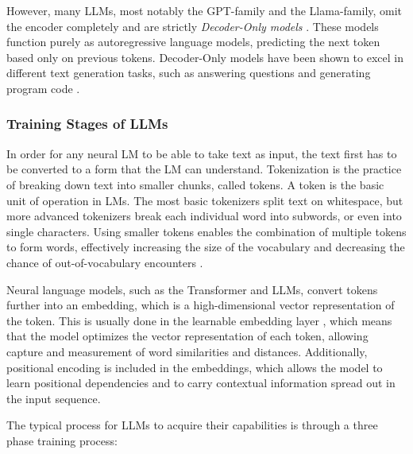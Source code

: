 \documentclass[english, 12pt, a4paper, sci, utf8, a-2b, online]{latex/definitions/aaltothesis}
\begin{document}
However, many LLMs, most notably the GPT-family and the Llama-family, omit the encoder completely and are strictly \textit{Decoder-Only models} \cite{Minaee2024-fr}. These models function purely as autoregressive language models, predicting the next token based only on previous tokens. Decoder-Only models have been shown to excel in different text generation tasks, such as answering questions and generating program code \cite{Chen2021EvaluatingLL}.

\subsubsection{Training Stages of LLMs} \label{sec:training}

In order for any neural LM to be able to take text as input, the text first has to be converted to a form that the LM can understand. Tokenization is the practice of breaking down text into smaller chunks, called tokens. A token is the basic unit of operation in LMs. The most basic tokenizers split text on whitespace, but more advanced tokenizers break each individual word into subwords, or even into single characters. Using smaller tokens enables the combination of multiple tokens to form words, effectively increasing the size of the vocabulary and decreasing the chance of out-of-vocabulary encounters \cite{Minaee2024-fr}.

Neural language models, such as the Transformer and LLMs, convert tokens further into an embedding, which is a high-dimensional vector representation of the token. This is usually done in the learnable embedding layer \cite{DBLP:journals/corr/VaswaniSPUJGKP17}, which means that the model optimizes the vector representation of each token, allowing capture and measurement of word similarities and distances. Additionally, positional encoding is included in the embeddings, which allows the model to learn positional dependencies and to carry contextual information spread out in the input sequence.

The typical process for LLMs to acquire their capabilities is through a three phase training process:
\end{document}
